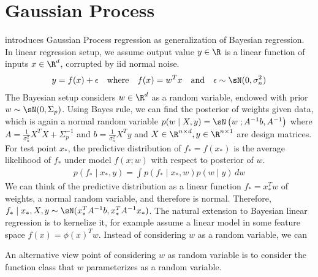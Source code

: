\documentclass[11pt]{article}
\begin{document}
 
\section{Gaussian Process}
 
\cite{carledwardrasmussenGaussianProcessMachine2006} introduces Gaussian Process regression as generalization of Bayesian regression. In linear regression setup, we assume output value $y\in\R$ is a linear function of inputs $x\in\R^d$, corrupted by iid normal noise.
\begin{align}
    y = f(x) + \epsilon
    \quad\text{where}\quad
    f(x) = w^Tx
    \quad\text{and}\quad
    \epsilon \sim \sN(0, \sigma_n^2)
\end{align}
The Bayesian setup considers $w\in\R^d$ as a random variable, endowed with prior $w\sim \sN(0,\Sigma_p)$. Using Bayes rule, we can find the posterior of weights given data, which is again a normal random variable $p(w \mid X, y) = \sN\left(w \; ; A^{-1}b, A^{-1} \right)$ where $A=\frac{1}{\sigma_n^2} X^TX + \Sigma_p^{-1}$ and $b = \frac{1}{\sigma_n^2}X^Ty$ and $X\in\R^{n\times d}, y\in\R^{n\times 1}$ are design matrices. For test point $x_*$, the predictive distribution of $f_*=f(x_*)$ is the average likelihood of $f_*$ under model $f(x;w)$ with respect to posterior of $w$.
\begin{align}
    p(f_*\mid x_*, y)
        = \int p(f_*\mid x_*,w) p(w\mid y) \, dw
\end{align}
We can think of the predictive distribution as a linear function $f_* = x_*^Tw$ of weights, a normal random variable, and therefore is normal. Therefore, $f_*\mid x_*,X,y \sim \sN( x_*^T A^{-1}b, x_*^T A^{-1}x_* )$. The natural extension to Bayesian linear regression is to kernelize it, for example assume a linear model in some feature space $f(x) = \phi(x)^Tw$. Instead of considering $w$ as a random variable, we can 

An alternative view point of considering $w$ as random variable is to consider the function class that $w$ parameterizes as a random variable.




 
 

\newpage
\printbibliography 
\end{document}
